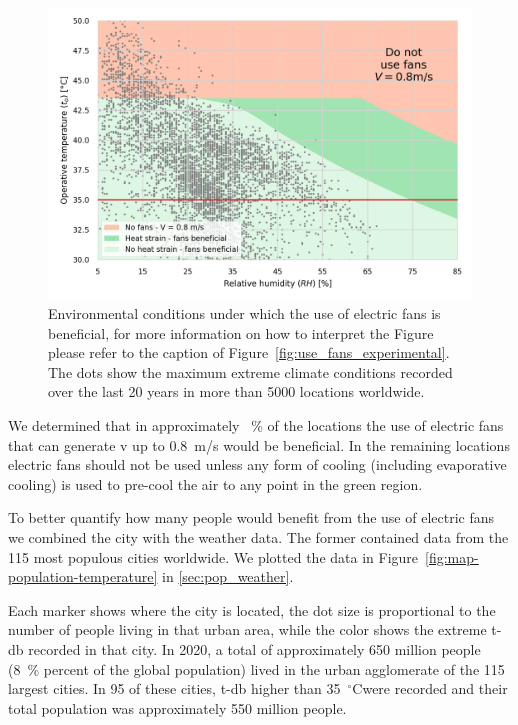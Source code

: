 \begin{figure}[hbt!]
    \centering
    \includegraphics[width=\textwidth]{figures/use_fans}
    \caption{Environmental conditions under which the use of electric fans is beneficial, for more information on how to interpret the Figure please refer to the caption of Figure~\ref{fig:use_fans_experimental}.
    The dots show the maximum extreme climate conditions recorded over the last 20 years in more than 5000 locations worldwide.}
    \label{fig:energy_storage_delta}
\end{figure}

We determined that in approximately ~\% of the locations the use of electric fans that can generate \ac{v} up to 0.8~m/s would be beneficial.
In the remaining locations electric fans should not be used unless any form of cooling (including evaporative cooling) is used to pre-cool the air to any point in the green region.

To better quantify how many people would benefit from the use of electric fans we combined the city with the weather data.
The former contained data from the 115 most populous cities worldwide.
We plotted the data in Figure~\ref{fig:map-population-temperature} in \ref{sec:pop_weather}.

Each marker shows where the city is located, the dot size is proportional to the number of people living in that urban area, while the color shows the extreme \ac{t-db} recorded in that city.
In 2020, a total of approximately 650 million people (8~\% percent of the global population) lived in the urban agglomerate of the 115 largest cities.
In 95 of these cities, \ac{t-db} higher than 35~$^{\circ}$C\@ were recorded and their total population was approximately 550 million people.

